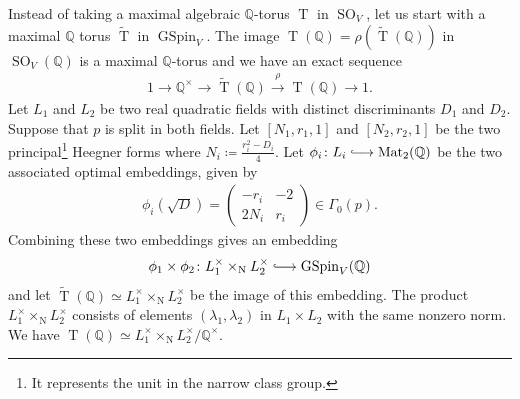 \documentclass[11pt]{article} %
\newcommand{\8}{\infty}
\newcommand{\GSpin}{\operatorname{GSpin}}
\newcommand{\Tbf}{\operatorname{T}}
\newcommand{\SO}{\operatorname{SO}}
\newcommand{\Ttil}{\widetilde{\operatorname{T}}}
\newcommand{\Q}{\mathbb{Q}}
\newcommand{\N}{\operatorname{N}}
\newcommand{\Mat}{\operatorname{Mat}}
\newcommand{\hooklongrightarrow}{\lhook\joinrel\longrightarrow}
\theoremstyle{mytheoremstyle}
\theoremstyle{remark}
\numberwithin{equation}{section}
\begin{document}
\subsubsection{} Instead of taking a maximal algebraic $\Q$-torus $\Tbf$ in $\SO_V$, let us start with a maximal $\Q$ torus $\Ttil$ in $\GSpin_V$. The image $\Tbf(\Q)=\rho(\Ttil(\Q))$ in $\SO_V(\Q)$ is a maximal $\Q$-torus and we have an exact sequence 
\begin{align}  
     1 \xrightarrow{\ \  \  \ \  } \Q^\times \xrightarrow{\ \  \  \ \  } \Ttil(\Q) \xrightarrow{\ \  \rho \ \  } \Tbf(\Q) \xrightarrow{\ \  \ \ \  } 1.
\end{align}
 Let $L_1$ and $L_2$ be two real quadratic fields with distinct discriminants $D_1$ and $D_2$. Suppose that $p$ is split in both fields. Let $[N_1,r_1,1]$ and $[N_2,r_2,1]$ be the two principal\footnote{It represents the unit in the narrow class group.} Heegner forms where $N_i \coloneqq \frac{r_i^2-D_i}{4}$. Let $\phi_i \colon L_i \hooklongrightarrow \Mat_2(\Q)$ be the two associated optimal embeddings, given by
\begin{align}
    \phi_i(\sqrt{D}) = \begin{pmatrix}
        -r_i & -2 \\ 2N_i & r_i
    \end{pmatrix}\in \Gamma_0(p).
\end{align}
Combining these two embeddings gives an embedding 
\begin{align} \label{Qiso}
    \phi_1 \times \phi_2 \colon L_1^\times \times_{\N} L_2^\times \hooklongrightarrow \GSpin_V(\Q) 
\end{align} and let $\Ttil(\Q) \simeq L_1^\times \times_{\N} L_2^\times$ be the image of this embedding. The product $L_1^\times \times_{\N} L_2^\times$ consists of elements $(\lambda_1,\lambda_2)$ in $L_1 \times L_2$ with the same nonzero norm. We have $\Tbf(\Q) \simeq L_1^\times \times_{\N} L_2^\times/ \Q^\times$.
\end{document}
